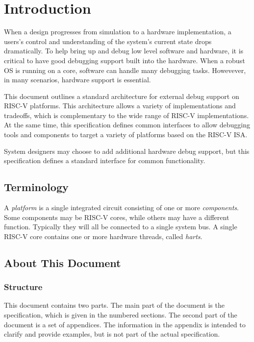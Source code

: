 \chapter{Introduction}
\label{sec:intro}

When a design progresses from simulation to a hardware implementation, a users's
control and understanding of the system's current state drops dramatically.
To help bring up and debug low level software and hardware,
it is critical to have good debugging support built into the hardware.
When a robust OS is running on a core, software can handle many
debugging tasks. Howevever, in many scenarios, hardware support is essential.

This document outlines a standard architecture for external debug support 
on RISC-V platforms. This architecture allows a variety of implementations and
tradeoffs, which is complementary to the wide range of RISC-V implementations.
At the same time, this specification defines common interfaces to
allow debugging tools and components to target a variety of platforms based on the RISC-V ISA.

System designers may choose to add additional hardware debug support,
but this specification defines a standard interface for common
functionality.

\section{Terminology}

A \emph{platform} is a single integrated circuit consisting of one or more
\emph{components}. Some components may be RISC-V cores, while others may have a different
function. Typically they will all be connected to a single system bus.
A single RISC-V core contains one or more hardware threads, called
\emph{harts}.

\section{About This Document}

\subsection{Structure}

This document contains two parts. The main part of the document is the
specification, which is given in the numbered sections. The second part
of the document is a set of  appendices. The information
in the appendix is intended to clarify and provide examples, but is
not part of the actual specification.


